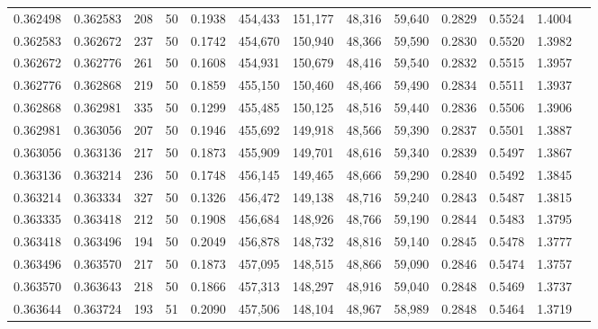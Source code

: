 \begin{tabular}{rrrrrrrrrrrrr}
0.362498 & 0.362583 &   208 &  50 &                                     0.1938 & 454,433 & 151,177 &  48,316 &  59,640 & 0.2829 & 0.5524 & 1.4004 \\
0.362583 & 0.362672 &   237 &  50 &                                     0.1742 & 454,670 & 150,940 &  48,366 &  59,590 & 0.2830 & 0.5520 & 1.3982 \\
0.362672 & 0.362776 &   261 &  50 &                                     0.1608 & 454,931 & 150,679 &  48,416 &  59,540 & 0.2832 & 0.5515 & 1.3957 \\
0.362776 & 0.362868 &   219 &  50 &                                     0.1859 & 455,150 & 150,460 &  48,466 &  59,490 & 0.2834 & 0.5511 & 1.3937 \\
0.362868 & 0.362981 &   335 &  50 &                                     0.1299 & 455,485 & 150,125 &  48,516 &  59,440 & 0.2836 & 0.5506 & 1.3906 \\
0.362981 & 0.363056 &   207 &  50 &                                     0.1946 & 455,692 & 149,918 &  48,566 &  59,390 & 0.2837 & 0.5501 & 1.3887 \\
0.363056 & 0.363136 &   217 &  50 &                                     0.1873 & 455,909 & 149,701 &  48,616 &  59,340 & 0.2839 & 0.5497 & 1.3867 \\
0.363136 & 0.363214 &   236 &  50 &                                     0.1748 & 456,145 & 149,465 &  48,666 &  59,290 & 0.2840 & 0.5492 & 1.3845 \\
0.363214 & 0.363334 &   327 &  50 &                                     0.1326 & 456,472 & 149,138 &  48,716 &  59,240 & 0.2843 & 0.5487 & 1.3815 \\
0.363335 & 0.363418 &   212 &  50 &                                     0.1908 & 456,684 & 148,926 &  48,766 &  59,190 & 0.2844 & 0.5483 & 1.3795 \\
0.363418 & 0.363496 &   194 &  50 &                                     0.2049 & 456,878 & 148,732 &  48,816 &  59,140 & 0.2845 & 0.5478 & 1.3777 \\
0.363496 & 0.363570 &   217 &  50 &                                     0.1873 & 457,095 & 148,515 &  48,866 &  59,090 & 0.2846 & 0.5474 & 1.3757 \\
0.363570 & 0.363643 &   218 &  50 &                                     0.1866 & 457,313 & 148,297 &  48,916 &  59,040 & 0.2848 & 0.5469 & 1.3737 \\
0.363644 & 0.363724 &   193 &  51 &                                     0.2090 & 457,506 & 148,104 &  48,967 &  58,989 & 0.2848 & 0.5464 & 1.3719 \\

\end{tabular}
